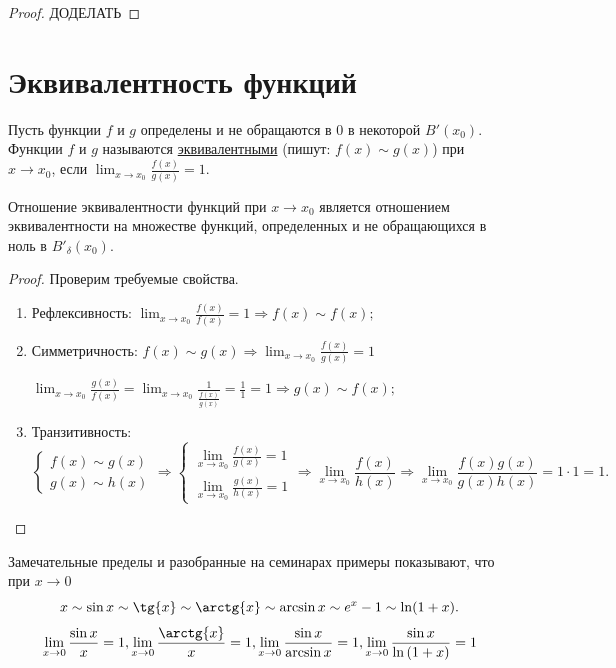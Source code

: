 	\begin{proof}
		ДОДЕЛАТЬ
	\end{proof}
	
	\section{Эквивалентность функций}
	
	\begin{definition}
		Пусть функции $f$ и $g$ определены и не обращаются в $0$ в некоторой $B'(x_0)$. Функции $f$ и $g$ называются \underline{эквивалентными} (пишут: $f(x) \sim g(x)$) при $x \to x_0$, если $\lim_{x \to x_0} \frac{f(x)}{g(x)} = 1$.
	\end{definition}
	
	\begin{lemma}
		Отношение эквивалентности функций при $x \to x_0$ является отношением эквивалентности на множестве функций, определенных и не обращающихся в ноль в $B'_{\delta}(x_0)$.
	\end{lemma}
	
	\begin{proof}
		Проверим требуемые свойства.
		\begin{enumerate}
			\item Рефлексивность: $\lim_{x \to x_0} \frac{f(x)}{f(x)} = 1 \Rightarrow f(x) \sim f(x);$
			\item Симметричность: $f(x) \sim g(x) \Rightarrow \lim_{x \to x_0} \frac{f(x)}{g(x)} = 1$
			
			$\lim_{x \to x_0} \frac{g(x)}{f(x)} = \lim_{x \to x_0} \frac{1}{\frac{f(x)}{g(x)}} = \frac{1}{1} = 1 \Rightarrow g(x) \sim f(x);$
			\item Транзитивность:
			\[ \begin{cases}
				f(x) \sim g(x) \\
				g(x) \sim h(x)
			\end{cases} \Rightarrow \begin{cases}
				\lim_{x \to x_0} \frac{f(x)}{g(x)} = 1 \\
				\lim_{x \to x_0} \frac{g(x)}{h(x)} = 1
			\end{cases} \Rightarrow \lim_{x \to x_0} \frac{f(x)}{h(x)} \Rightarrow \lim_{x \to x_0} \frac{f(x) g(x)}{g(x) h(x)} = 1 \cdot 1 = 1. \]
		\end{enumerate}
	\end{proof}
	
	\begin{mention}
		Замечательные пределы и разобранные на семинарах примеры показывают, что при $x \to 0$
		\[ x \sim \sin{x} \sim \tg{x} \sim \arctg{x} \sim \arcsin{x} \sim e^x - 1 \sim \ln(1 + x). \]
		\[ \lim_{x \to 0} \frac{\sin{x}}{x} = 1, \lim_{x \to 0} \frac{\arctg{x}}{x} = 1,  \lim_{x \to 0} \frac{\sin{x}}{\arcsin{x}} = 1, \lim_{x \to 0} \frac{\sin{x}}{\ln{(1 + x)}} = 1 \]
	\end{mention}
	
